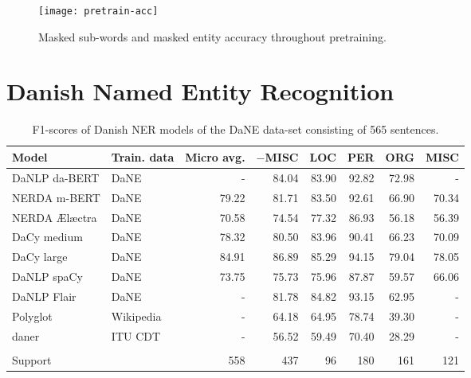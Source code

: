\documentclass[main.tex]{subfiles}
\begin{document}
\begin{figure}[H]
    \centering
    \texttt{[image: pretrain-acc]}
    \caption{Masked sub-words and masked entity accuracy throughout pretraining.}
    \label{fig:pretrain-acc}
\end{figure}\noindent

\section{Danish Named Entity Recognition}%
\begin{table}
        \begin{center}
                \begin{tabular}{l l r r r r r r}
                        Model & Train. data & Micro avg. & $-$MISC & LOC & PER & ORG & MISC \\
                        \hline
                        DaNLP da-BERT & DaNE & - & 84.04 & 83.90 & 92.82 & 72.98 & - \\
                        NERDA m-BERT & DaNE & 79.22 & 81.71 & 83.50 & 92.61 & 66.90 & 70.34 \\
                        NERDA Ælæctra & DaNE & 70.58 & 74.54 & 77.32 & 86.93 & 56.18 & 56.39 \\
                        DaCy medium & DaNE & 78.32 & 80.50 & 83.96 & 90.41 & 66.23 & 70.09 \\
                        DaCy large & DaNE & 84.91 & 86.89 & 85.29 & 94.15 & 79.04 & 78.05 \\
                        DaNLP spaCy & DaNE & 73.75 & 75.73 & 75.96 & 87.87 & 59.57 & 66.06 \\
                        DaNLP Flair & DaNE & - & 81.78 & 84.82 & 93.15 & 62.95 & - \\
                        Polyglot & Wikipedia & - & 64.18 & 64.95 & 78.74 & 39.30 & - \\
                        daner & ITU CDT & - & 56.52 & 59.49 & 70.40 & 28.29 & - \\
                         &  &  &  &  &  &  &  \\
                        Support &  & 558 & 437 & 96 & 180 & 161 & 121 \\
                \end{tabular}
        \end{center}
        \caption{F1\pro-scores of Danish NER models of the DaNE data-set consisting of 565 sentences.}
        \label{tab:DaNE}
\end{table}
\end{document}
